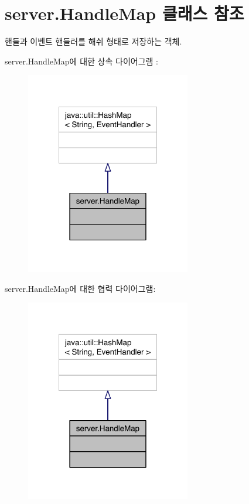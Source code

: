 \hypertarget{classserver_1_1_handle_map}{\section{server.\-Handle\-Map 클래스 참조}
\label{classserver_1_1_handle_map}
}


핸들과 이벤트 핸들러를 해쉬 형태로 저장하는 객체.  




server.\-Handle\-Map에 대한 상속 다이어그램 \-: \nopagebreak
\begin{figure}[H]
\begin{center}
\leavevmode
\includegraphics[width=204pt]{classserver_1_1_handle_map__inherit__graph}
\end{center}
\end{figure}


server.\-Handle\-Map에 대한 협력 다이어그램\-:\nopagebreak
\begin{figure}[H]
\begin{center}
\leavevmode
\includegraphics[width=204pt]{classserver_1_1_handle_map__coll__graph}
\end{center}
\end{figure}


